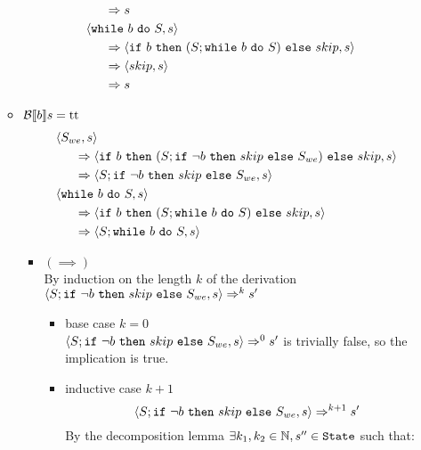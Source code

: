 \begin{exercise}
\begin{enumerate}
\begin{itemize}
\begin{align*}
                        \\&\quad\ \ \Rightarrow s
                        \\
                        &\left<\texttt{while}\ b\ \texttt{do}\ S, s\right>
                        \\&\quad\ \ \Rightarrow \left<\texttt{if}\ b\ \texttt{then}\ (S; \texttt{while}\ b\ \texttt{do}\ S)\ \texttt{else}\ skip, s\right>
                        \\&\quad\ \ \Rightarrow \left<skip, s\right>
                        \\&\quad\ \ \Rightarrow s
                    \end{align*}
                \item $\mathcal{B} \llbracket b \rrbracket s = \text{tt}$
                    \begin{align*}
                        &\left<S_{we}, s\right>
                        \\&\quad\ \ \Rightarrow \left<\texttt{if}\ b\ \texttt{then}\ (S; \texttt{if}\ \neg b\ \texttt{then}\ skip\ \texttt{else}\ S_{we})\ \texttt{else}\ skip, s\right>
                        \\&\quad\ \ \Rightarrow \left<S; \texttt{if}\ \neg b\ \texttt{then}\ skip\ \texttt{else}\ S_{we}, s\right>
                        \\
                        &\left<\texttt{while}\ b\ \texttt{do}\ S, s\right>
                        \\&\quad\ \ \Rightarrow \left<\texttt{if}\ b\ \texttt{then}\ (S; \texttt{while}\ b\ \texttt{do}\ S)\ \texttt{else}\ skip, s\right>
                        \\&\quad\ \ \Rightarrow \left<S; \texttt{while}\ b\ \texttt{do}\ S, s\right>
                    \end{align*}
                    \begin{itemize}
                        \item $(\implies)$ \vspace{0.2cm} \\
                            By induction on the length $k$ of the derivation \\ $\left<S; \texttt{if}\ \neg b\ \texttt{then}\ skip\ \texttt{else}\ S_{we}, s\right> \Rightarrow^k s'$
                            \begin{itemize}
                                \item base case $k=0$ \\
                                    $\left<S; \texttt{if}\ \neg b\ \texttt{then}\ skip\ \texttt{else}\ S_{we}, s\right> \Rightarrow^0 s'$ is trivially false, so the implication is true.
                                \item inductive case $k+1$ \vspace*{-0.3cm}
                                    \[ \left<S; \texttt{if}\ \neg b\ \texttt{then}\ skip\ \texttt{else}\ S_{we}, s\right> \Rightarrow^{k+1} s' \]
                                    By the decomposition lemma $\exists k_1, k_2 \in \mathbb{N}, s'' \in \texttt{State}$ such that:

\end{itemize}
\end{itemize}
\end{itemize}
\end{enumerate}
\end{exercise}
